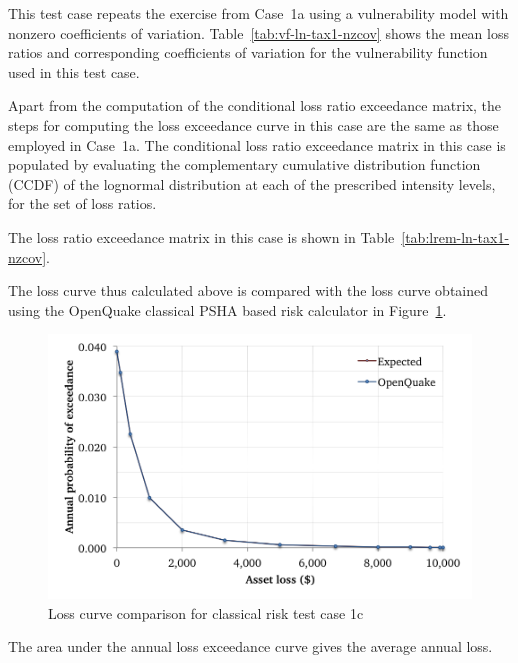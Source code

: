 This test case repeats the exercise from Case~1a using a vulnerability model with nonzero coefficients of variation. Table~\ref{tab:vf-ln-tax1-nzcov} shows the mean loss ratios and corresponding coefficients of variation for the vulnerability function used in this test case.

Apart from the computation of the conditional loss ratio exceedance matrix, the steps for computing the loss exceedance curve in this case are the same as those employed in Case~1a. The conditional loss ratio exceedance matrix in this case is populated by evaluating the complementary cumulative distribution function (CCDF) of the lognormal distribution at each of the prescribed intensity levels, for the set of loss ratios.



The loss ratio exceedance matrix in this case is shown in Table~\ref{tab:lrem-ln-tax1-nzcov}.

The loss curve thus calculated above is compared with the loss curve obtained using the OpenQuake classical PSHA based risk calculator in Figure~\ref{fig:lc-cr-1c}.

\begin{figure}[htbp]
\centering
\includegraphics[width=12cm]{qareport/figures/fig-lc-cr-1c}
\caption{Loss curve comparison for classical risk test case 1c}
\label{fig:lc-cr-1c}
\end{figure}

The area under the annual loss exceedance curve gives the average annual loss.